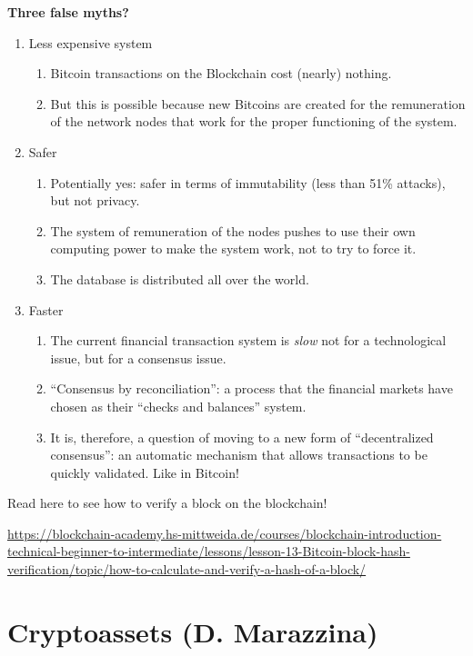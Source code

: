 \textbf{Three false myths?}
\begin{enumerate}
	\item Less expensive system
	      \begin{enumerate}
	      	\item Bitcoin transactions on the Blockchain cost (nearly) nothing.
	      	\item But this is possible because new Bitcoins are created for the remuneration of the network nodes that work for the proper functioning of the system.
	      \end{enumerate}
	\item Safer
	      \begin{enumerate}
	      	\item Potentially yes: safer in terms of immutability (less than 51\% attacks), but not privacy.
	      	\item The system of remuneration of the nodes pushes to use their own computing power to make the system work, not to try to force it.
	      	\item The database is distributed all over the world.
	      \end{enumerate}
	\item Faster
	      \begin{enumerate}
	      	\item The current financial transaction system is \textit{slow} not for a technological issue, but for a consensus issue.
	      	\item ``Consensus by reconciliation'': a process that the financial markets have chosen as their ``checks and balances'' system.
	      	\item It is, therefore, a question of moving to a new form of ``decentralized consensus'': an automatic mechanism that allows transactions to be quickly validated. Like in Bitcoin!
	      \end{enumerate}
\end{enumerate}

Read here to see how to verify a block on the blockchain!

{\scriptsize\url{https://blockchain-academy.hs-mittweida.de/courses/blockchain-introduction-technical-beginner-to-intermediate/lessons/lesson-13-Bitcoin-block-hash-verification/topic/how-to-calculate-and-verify-a-hash-of-a-block/}}

\section{Cryptoassets (D. Marazzina)}

